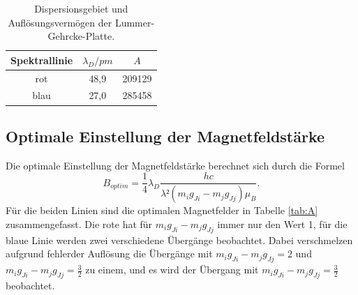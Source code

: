 \FloatBarrier
\begin{table}
    \centering
    \caption{Dispersionsgebiet und Auflösungsvermögen der Lummer-Gehrcke-Platte.}
    \label{tab:v1}
    \begin{tabular}{c S[table-format=2.1] S[table-format=6.0] }
      \toprule
       {Spektrallinie} & {$\lambda_{\si{D}}/\si{pm}$}& {$A$}\\
      \midrule
      \midrule
        rot & 48,9 & 209129 \\
        blau & 27,0 & 285458 \\
      \bottomrule
    \end{tabular}
\end{table}
\FloatBarrier


\subsection{Optimale Einstellung der Magnetfeldstärke}
\label{sec:bo}

Die optimale Einstellung der Magnetfeldstärke berechnet sich durch die Formel 
\begin{equation*}
  B_{\si{optim}}= \frac{1}{4} \lambda_{\si{D}} \frac{h c}{\lambda² (m_i g_{Ji} - m_j g_{Jj}) \mu_B}.
\end{equation*}
Für die beiden Linien sind die optimalen Magnetfelder in Tabelle \ref{tab:A} zusammengefasst. Die rote 
hat für $m_i g_{Ji} - m_j g_{Jj}$ immer nur den Wert 1, für die blaue Linie werden zwei verschiedene Übergänge 
beobachtet. Dabei verschmelzen aufgrund fehlerder Auflösung die Übergänge mit $m_i g_{Ji} - m_j g_{Jj} = 2$ 
und $m_i g_{Ji} - m_j g_{Jj} = \frac{3}{2}$ zu einem, und es wird der Übergang mit $m_i g_{Ji} - m_j g_{Jj} = \frac{3}{2}$ 
beobachtet.


